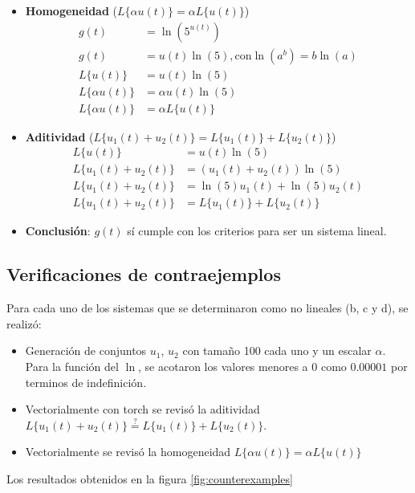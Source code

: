 \documentclass[12pt,a4paper]{article}
\begin{document}
\begin{itemize}
    \item \textbf{Homogeneidad} ($L\{\alpha u(t)\} = \alpha L\{u(t)\}$)
    \begin{align*}
        g(t)&=\ln(5^{u(t)})\\
        g(t) &= u(t)\ln(5), \text{con} \ln(a^b)=b\ln(a)\\
        L\{u(t)\} &= u(t)\ln(5)\\
        L\{\alpha u(t)\} &= \alpha u(t) \ln(5)\\
        L\{\alpha u(t)\} &= \alpha L\{u(t)\}
    \end{align*}
    \item \textbf{Aditividad} ($L\{u_1(t)+u_2(t)\}=L\{u_1(t)\}+ L\{u_2(t)\}$)
        \begin{align*}
        L\{u(t)\} &= u(t)\ln(5)\\
        L\{u_1(t)+u_2(t)\} &= (u_1(t)+u_2(t)) \ln(5)\\
        L\{u_1(t)+u_2(t)\} &= \ln(5)u_1(t)+\ln(5)u_2(t)\\
        L\{u_1(t)+u_2(t)\} &= L\{u_1(t)\}+L\{u_2(t)\}
    \end{align*}
    \item \textbf{Conclusión}: $g(t)$ sí cumple con los criterios para ser un sistema lineal.
\end{itemize}

\subsection{Verificaciones de contraejemplos}
\label{subsec:contraejemplos}

Para cada uno de los sistemas que se determinaron como no lineales (b, c y d), se realizó:
\begin{itemize}
    \item Generación de conjuntos $u_1$, $u_2$ con tamaño 100 cada uno y un escalar $\alpha$. Para la función del $\ln$, se acotaron los valores menores a 0 como $0.00001$ por terminos de indefinición.
    \item Vectorialmente con torch se revisó la aditividad $L\{u_1(t)+u_2(t)\} \overset{?}{=} L\{u_1(t)\}+L\{u_2(t)\}$.
    \item Vectorialmente se revisó la homogeneidad $L\{\alpha u(t)\} = \alpha L\{u(t)\}$
\end{itemize}

Los resultados obtenidos en la figura \ref{fig:counterexamples}
\end{document}
